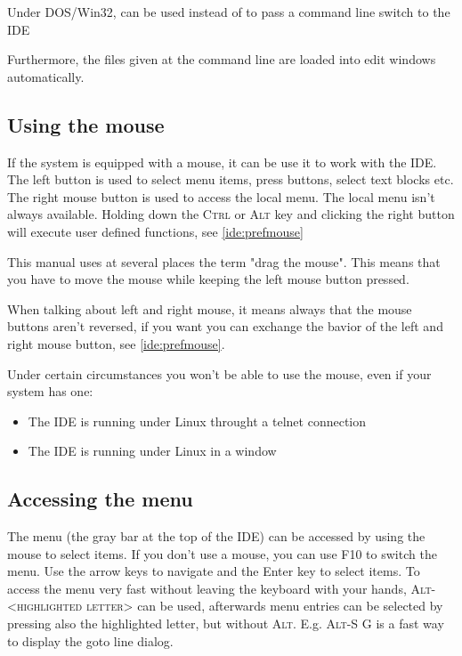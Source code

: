 Under DOS/Win32, \var{/} can be used instead of \var{\-} to pass a
command line switch to the IDE

Furthermore, the files given at the command line are loaded into edit
windows automatically.

\subsection{Using the mouse}
\label{ide:mouseusage}
If the system is equipped with a mouse, it can be use it to work with the
IDE. The left button is used to select menu items, press buttons, select
text blocks etc. The right mouse button is used to access the local menu.
The local menu isn't always available. Holding down the \textsc{Ctrl} or
\textsc{Alt} key and clicking the right button will
execute user defined functions, see \ref{ide:prefmouse}

\begin{remark}
This manual uses at several places the term "drag the mouse". This
means that you have to move the mouse while keeping the left
mouse button pressed.
\end{remark}

\begin{remark}
When talking about left and right mouse, it means always that the
mouse buttons aren't reversed, if you want you can exchange the
bavior of the left and right mouse button, see \ref{ide:prefmouse}.
\end{remark}

\begin{remark}
Under certain circumstances you won't be able to use the mouse,
even if your system has one:
\begin{itemize}
\item The IDE is running under Linux throught a telnet connection
\item The IDE is running under Linux in a window
\end{itemize}
\end{remark}

\subsection{Accessing the menu}
The menu (the gray bar at the top of the IDE) can be accessed by using
the mouse to select items. If you don't use a mouse, you can use
\textsc{F10} to switch the menu. Use the arrow keys to navigate and the Enter
key to select items. To access the menu very fast without leaving the
keyboard with your hands, \textsc{Alt-<highlighted letter>}
can be used, afterwards
menu entries can be selected by pressing also the highlighted letter, but
without \textsc{Alt}. E.g. \textsc{Alt-S G} is a fast way to
display the goto line dialog.

